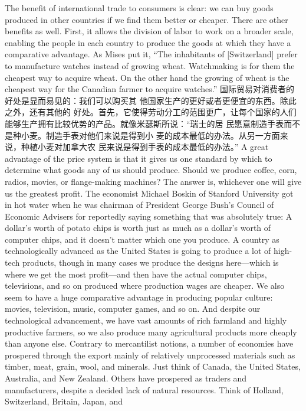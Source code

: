 \begin{paracol}{2}
\switchcolumn*
The benefit of international trade to consumers is clear: we
can buy goods produced in other countries if we find them better or cheaper. There are other benefits as well. First, it allows
the division of labor to work on a broader scale, enabling the
people in each country to produce the goods at which they have
a comparative advantage. As Mises put it, ``The inhabitants of
[Switzerland] prefer to manufacture watches instead of growing wheat. Watchmaking is for them the cheapest way to acquire
wheat. On the other hand the growing of wheat is the cheapest
way for the Canadian farmer to acquire watches.''
\switchcolumn
国际贸易对消费者的好处是显而易见的：我们可以购买其
他国家生产的更好或者更便宜的东西。除此之外，还有其他的
好处。首先，它使得劳动分工的范围更广，让每个国家的人们
能够生产拥有比较优势的产品。就像米瑟斯所说：“瑞士的居
民愿意制造手表而不是种小麦。制造手表对他们来说是得到小
麦的成本最低的办法。从另一方面来说，种植小麦对加拿大农
民来说是得到手表的成本最低的办法。”
\switchcolumn*
A great advantage of the price system is that it gives us one
standard by which to determine what goods any of us should
produce. Should we produce coffee, corn, radios, movies, or
flange-making machines? The answer is, whichever one will
give us the greatest profit. The economist Michael Boskin of
Stanford University got in hot water when he was chairman of
President George Bush's Council of Economic Advisers for reportedly saying something that was absolutely true: A dollar's
worth of potato chips is worth just as much as a dollar's worth
of computer chips, and it doesn't matter which one you produce. A country as technologically advanced as the United
States is going to produce a lot of high-tech products, though in
many cases we produce the designs here---which is where we
get the most profit---and then have the actual computer chips,
televisions, and so on produced where production wages are
cheaper. We also seem to have a huge comparative advantage in
producing popular culture: movies, television, music, computer
games, and so on. And despite our technological advancement,
we have vast amounts of rich farmland and highly productive
farmers, so we also produce many agricultural products more
cheaply than anyone else. Contrary to mercantilist notions, a
number of economies have prospered through the export
mainly of relatively unprocessed materials such as timber, meat,
grain, wool, and minerals. Just think of Canada, the United
States, Australia, and New Zealand. Others have prospered as
traders and manufacturers, despite a decided lack of natural resources. Think of Holland, Switzerland, Britain, Japan, and

\end{paracol}
